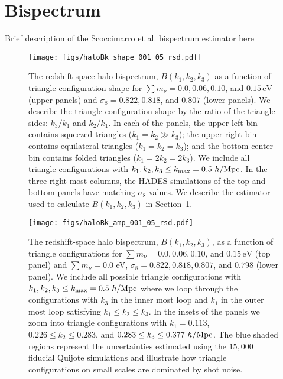 \documentclass[12pt, letterpaper, preprint]{aastex62}
\newcommand{\smnu}{\sum m_\nu}
\newcommand{\sig}{\sigma_8}
\begin{document}
\section{Bispectrum} \label{sec:bk} 
Brief description of the Scoccimarro et al. bispectrum estimator here 

\begin{figure}
\begin{center}
    \texttt{[image: figs/haloBk\_shape\_001\_05\_rsd.pdf]} 
    \caption{The redshift-space halo bispectrum, $B(k_1, k_2, k_3)$ as a 
    function of triangle configuration shape for $\smnu = 0.0, 0.06, 0.10$, 
    and $0.15\,\mathrm{eV}$ (upper panels) and $\sig = 0.822, 0.818$, and 
    $0.807$ (lower panels). We describe the triangle configuration shape 
    by the ratio of the triangle sides: $k_3/k_1$ and $k_2/k_1$. In each 
    of the panels, the upper left bin contains squeezed triangles 
    ($k_1 = k_2 \gg k_3$); the upper right bin contains equilateral triangles 
    ($k_1 = k_2 = k_3$); and the bottom center bin contains folded triangles 
    ($k_1 = 2 k_2 = 2 k_3$). We include all triangle configurations with 
    $k_1, k_2, k_3 \leq k_{\rm max} = 0.5~h/{\rm Mpc}$. In the three 
    right-most columns, the HADES simulations of the top and bottom panels 
    have matching $\sig$ values. We describe the estimator used to calculate 
    $B(k_1, k_2, k_3)$ in Section~\ref{sec:bk}.}
\label{fig:bk_shape}
\end{center}
\end{figure}

\begin{figure}
\begin{center}
\texttt{[image: figs/haloBk\_amp\_001\_05\_rsd.pdf]}
    \caption{The redshift-space halo bispectrum, $B(k_1, k_2, k_3)$, as a
    function of triangle configurations for $\smnu = 0.0, 0.06, 0.10$, 
    and $0.15\,\mathrm{eV}$ (top panel) and $\smnu = 0.0$ eV, $\sig = 0.822, 0.818, 0.807$, 
    and $0.798$ (lower panel). We include all possible triangle configurations 
    with $k_1, k_2, k_3 \leq k_{\rm max} = 0.5~h/{\rm Mpc}$ where we loop 
    through the configurations with $k_3$ in the inner most loop and 
    $k_1$ in the outer most loop satisfying $k_1 \leq k_2 \leq k_3$. In the 
    insets of the panels we zoom into triangle configurations with 
    $k_1 = 0.113$, $0.226 \leq k_2 \leq 0.283$, and $0.283 \leq k_3 \leq 0.377~h/{\rm Mpc}$. 
    The blue shaded regions represent the uncertainties estimated using 
    the $15,000$ fiducial Quijote simulations and illustrate how triangle 
    configurations on small scales are dominated by shot noise.}
\label{fig:bk_amp}
\end{center}
\end{figure}
\end{document}
